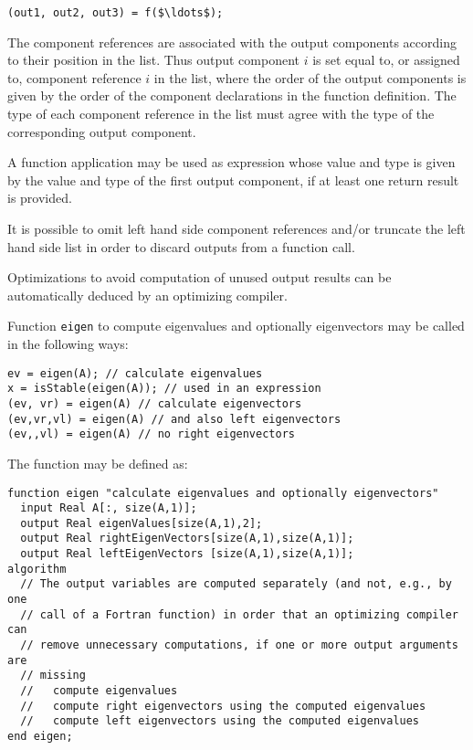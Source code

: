 \lstinline!(out1, out2, out3) = f($\ldots$);!

The component references are associated with the output components according to their position in the list.
Thus output component $i$ is set equal to, or assigned to, component reference $i$ in the list, where the order of the output components is given by the order of the component declarations in the function definition.
The type of each component reference in the list must agree with the type of the corresponding output component.

A function application may be used as expression whose value and type is given by the value and type of the first output component, if at least one return result is provided.

It is possible to omit left hand side component references and/or truncate the left hand side list in order to discard outputs from a function call.

\begin{nonnormative}
Optimizations to avoid computation of unused output results can be automatically deduced by an optimizing compiler.
\end{nonnormative}

\begin{example}
Function \lstinline!eigen! to compute eigenvalues and optionally eigenvectors may be called in the following ways:
\begin{lstlisting}[language=modelica]
ev = eigen(A); // calculate eigenvalues
x = isStable(eigen(A)); // used in an expression
(ev, vr) = eigen(A) // calculate eigenvectors
(ev,vr,vl) = eigen(A) // and also left eigenvectors
(ev,,vl) = eigen(A) // no right eigenvectors
\end{lstlisting}
The function may be defined as:
\begin{lstlisting}[language=modelica]
function eigen "calculate eigenvalues and optionally eigenvectors"
  input Real A[:, size(A,1)];
  output Real eigenValues[size(A,1),2];
  output Real rightEigenVectors[size(A,1),size(A,1)];
  output Real leftEigenVectors [size(A,1),size(A,1)];
algorithm
  // The output variables are computed separately (and not, e.g., by one
  // call of a Fortran function) in order that an optimizing compiler can
  // remove unnecessary computations, if one or more output arguments are
  // missing
  //   compute eigenvalues
  //   compute right eigenvectors using the computed eigenvalues
  //   compute left eigenvectors using the computed eigenvalues
end eigen;
\end{lstlisting}
\end{example}

